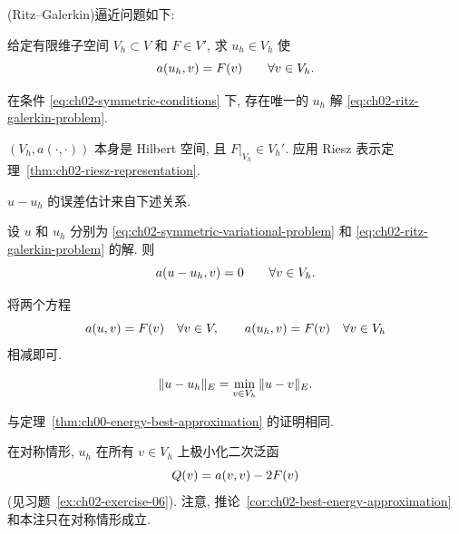 (Ritz--Galerkin)逼近问题如下:

给定有限维子空间 $V_h\subset V$ 和 $F\in V'$, 求 $u_h\in V_h$ 使
\setcounter{equation}{6}
\begin{equation}
\MathBookFormulaID{formula-ch02-ritz-galerkin-problem}
a(u_h,v)=F(v)\qquad\forall v\in V_h.
\label{eq:ch02-ritz-galerkin-problem}
\end{equation}

\setcounter{thmcount}{7}
\begin{Theorem}
\label{thm:ch02-ritz-galerkin-existence}
在条件 \eqref{eq:ch02-symmetric-conditions} 下, 存在唯一的 $u_h$ 解 \eqref{eq:ch02-ritz-galerkin-problem}.
\end{Theorem}

\begin{Proof}
$(V_h,a(\cdot,\cdot))$ 本身是 Hilbert 空间, 且 $F|_{V_h}\in V_h'$. 应用 Riesz 表示定理~\ref{thm:ch02-riesz-representation}.
\end{Proof}

$u-u_h$ 的误差估计来自下述关系.

\begin{Proposition}
\label{prop:ch02-galerkin-orthogonality-symmetric}
设 $u$ 和 $u_h$ 分别为 \eqref{eq:ch02-symmetric-variational-problem} 和 \eqref{eq:ch02-ritz-galerkin-problem} 的解. 则
\[
\MathBookFormulaID{formula-ch02-galerkin-orthogonality-symmetric}
a(u-u_h,v)=0\qquad\forall v\in V_h.
\]
\end{Proposition}

\begin{Proof}
将两个方程
\[
\MathBookFormulaID{formula-ch02-galerkin-equations-subtraction}
a(u,v)=F(v)\quad\forall v\in V,
\qquad
a(u_h,v)=F(v)\quad\forall v\in V_h
\]
相减即可.
\end{Proof}

\begin{Corollary}
\label{cor:ch02-best-energy-approximation}
\[
\MathBookFormulaID{formula-ch02-best-energy-approximation}
\|u-u_h\|_E=\min_{v\in V_h}\|u-v\|_E.
\]
\end{Corollary}

\begin{Proof}
与定理~\ref{thm:ch00-energy-best-approximation} 的证明相同.
\end{Proof}

\begin{Remark}[Ritz 方法]
\label{rem:ch02-ritz-method}
在对称情形, $u_h$ 在所有 $v\in V_h$ 上极小化二次泛函
\[
\MathBookFormulaID{formula-ch02-ritz-functional}
Q(v)=a(v,v)-2F(v)
\]
(见习题~\ref{ex:ch02-exercise-06}). 注意, 推论~\ref{cor:ch02-best-energy-approximation} 和本注只在对称情形成立.
\end{Remark}

